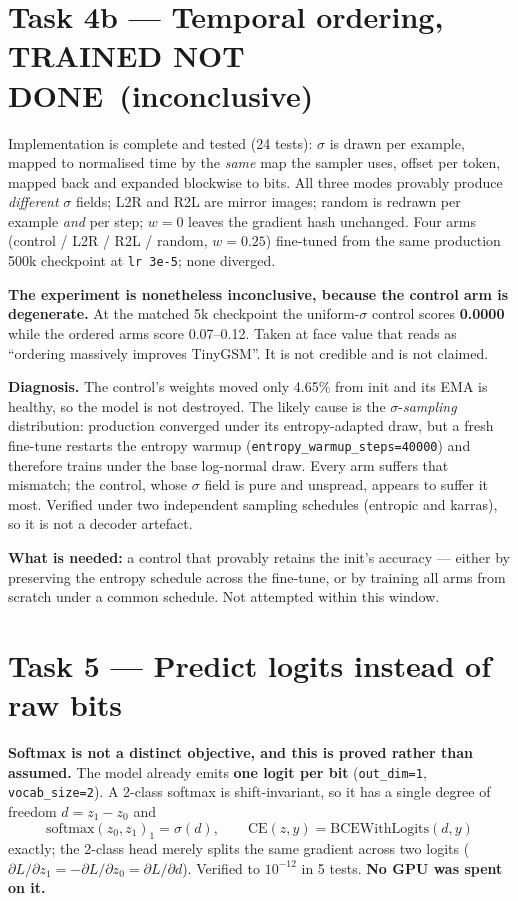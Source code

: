 \documentclass[10pt,a4paper]{article}
\newcommand{\code}[1]{\texttt{\small #1}}
\newcommand{\no}{\textcolor{red!70!black}{\textbf{NOT DONE}}}
\begin{document}
\section{Task 4b --- Temporal ordering, TRAINED \no\ (inconclusive)}
Implementation is complete and tested (24 tests): $\sigma$ is drawn per example,
mapped to normalised time by the \emph{same} map the sampler uses, offset per
token, mapped back and expanded blockwise to bits. All three modes provably
produce \emph{different} $\sigma$ fields; L2R and R2L are mirror images; random
is redrawn per example \emph{and} per step; $w{=}0$ leaves the gradient hash
unchanged. Four arms (control / L2R / R2L / random, $w{=}0.25$) fine-tuned from
the same production 500k checkpoint at \code{lr 3e-5}; none diverged.

\textbf{The experiment is nonetheless inconclusive, because the control arm is
degenerate.} At the matched 5k checkpoint the uniform-$\sigma$ control scores
\textbf{0.0000} while the ordered arms score 0.07--0.12. Taken at face value
that reads as ``ordering massively improves TinyGSM''. It is not credible and
is not claimed.

\textbf{Diagnosis.} The control's weights moved only 4.65\% from init and its
EMA is healthy, so the model is not destroyed. The likely cause is the
$\sigma$-\emph{sampling} distribution: production converged under its
entropy-adapted draw, but a fresh fine-tune restarts the entropy warmup
(\code{entropy\_warmup\_steps=40000}) and therefore trains under the base
log-normal draw. Every arm suffers that mismatch; the control, whose $\sigma$
field is pure and unspread, appears to suffer it most. Verified under two
independent sampling schedules (entropic and karras), so it is not a decoder
artefact.

\textbf{What is needed:} a control that provably retains the init's accuracy ---
either by preserving the entropy schedule across the fine-tune, or by training
all arms from scratch under a common schedule. Not attempted within this window.

\section{Task 5 --- Predict logits instead of raw bits}
\textbf{Softmax is not a distinct objective, and this is proved rather than
assumed.} The model already emits \textbf{one logit per bit}
(\code{out\_dim=1}, \code{vocab\_size=2}). A 2-class softmax is shift-invariant,
so it has a single degree of freedom $d=z_1-z_0$ and
\[
\mathrm{softmax}(z_0,z_1)_1=\sigma(d),\qquad
\mathrm{CE}(z,y)=\mathrm{BCEWithLogits}(d,y)
\]
exactly; the 2-class head merely splits the same gradient across two logits
($\partial L/\partial z_1=-\partial L/\partial z_0=\partial L/\partial d$).
Verified to $10^{-12}$ in 5 tests. \textbf{No GPU was spent on it.}
\end{document}
